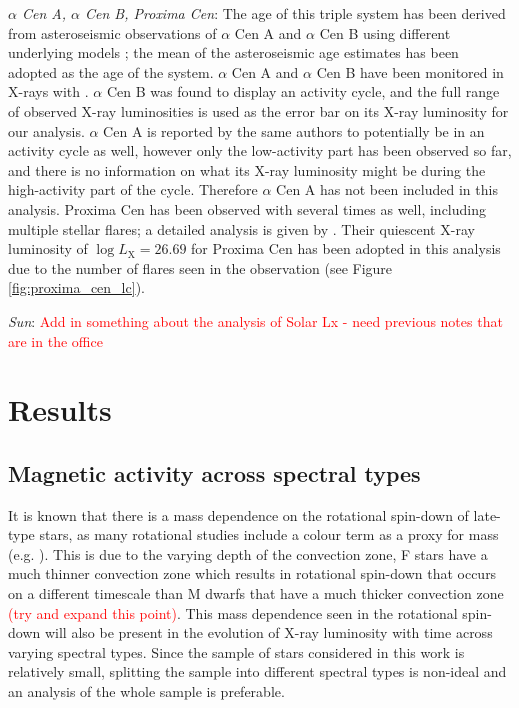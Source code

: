 \textit{$\alpha$ Cen A, $\alpha$ Cen B, Proxima Cen}: The age of this triple system has been derived from asteroseismic observations of $\alpha$ Cen A and $\alpha$ Cen B using different underlying models \citep{Miglio_Montalban_2005}; the mean of the asteroseismic age estimates has been adopted as the age of the system. $\alpha$ Cen A and $\alpha$ Cen B have been monitored in X-rays with \XMM \citep{Robrade_etal_2012}. $\alpha$ Cen B was found to display an activity cycle, and the full range of observed X-ray luminosities is used as the error bar on its X-ray luminosity for our analysis. $\alpha$ Cen A is reported by the same authors to potentially be in an activity cycle as well, however only the low-activity part has been observed so far, and there is no information on what its X-ray luminosity might be during the high-activity part of the cycle. Therefore $\alpha$ Cen A has not been included in this analysis. Proxima Cen has been observed with \XMM several times as well, including multiple stellar flares; a detailed analysis is given by \citet{Fuhrmeister_etal_2011}. Their quiescent X-ray luminosity of $\log L_{\mathrm{X}} = 26.69$ for Proxima Cen has been adopted in this analysis due to the number of flares seen in the observation (see Figure \ref{fig:proxima_cen_lc}).

\textit{Sun}: \textcolor{red}{Add in something about the analysis of Solar Lx - need previous notes that are in the office}

\section{Results}
\subsection{Magnetic activity across spectral types}
It is known that there is a mass dependence on the rotational spin-down of late-type stars, as many rotational studies include a colour term as a proxy for mass (e.g. \citealt{Barnes_2003,Barnes_2010,Angus_etal_2015}). This is due to the varying depth of the convection zone, F stars have a much thinner convection zone which results in rotational spin-down that occurs on a different timescale than M dwarfs that have a much thicker convection zone \textcolor{red}{(try and expand this point)}. This mass dependence seen in the rotational spin-down will also be present in the evolution of X-ray luminosity with time across varying spectral types. Since the sample of stars considered in this work is relatively small, splitting the sample into different spectral types is non-ideal and an analysis of the whole sample is preferable.

